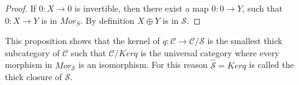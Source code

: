     \begin{proof}
        If $0:X\rightarrow 0$ is invertible, then there exist a map $0:0\rightarrow Y$, such that $0:X\rightarrow Y$ is in $Mor_S$. By definition $X\oplus Y$ is in $\mathcal{S}$.
    \end{proof}

    This proposition shows that the kernel of $q:\mathcal{C}\rightarrow\mathcal{C}/\mathcal{S}$ is the smallest thick subcategory of $\mathcal{C}$ such that $\mathcal{C}/Kerq$ is the universal category where every morphism in $Mor_\mathcal{S}$ is an isomorphism. For this reason $\widehat{\mathcal{S}}=Kerq$ is called the thick closure of $\mathcal{S}$.


